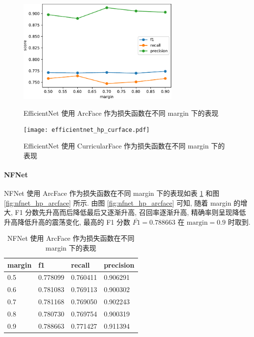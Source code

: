 \documentclass[12pt]{article}
\begin{document}
\begin{figure}[htbp]
  \centering
  \begin{minipage}[t]{0.48\textwidth}
    \centering
    \includegraphics[width=8cm]{efficientnet_hp_arcface.pdf}
    \caption{EfficientNet 使用 ArcFace 作为损失函数在不同 margin 下的表现}
    \label{fig:efficientnet_hp_arcface}
  \end{minipage}
  \begin{minipage}[t]{0.48\textwidth}
    \centering
    \texttt{[image: efficientnet\_hp\_curface.pdf]}
    \caption{EfficientNet 使用 CurricularFace 作为损失函数在不同 margin 下的表现}
    \label{fig:efficientnet_hp_curface}
  \end{minipage}
\end{figure}

\paragraph{NFNet}

NFNet 使用 ArcFace 作为损失函数在不同 margin 下的表现如表 \ref{tab:nfnet_hp_arcface} 和图 \ref{fig:nfnet_hp_arcface} 所示. 由图 \ref{fig:nfnet_hp_arcface} 可知, 随着 margin 的增大, F1 分数先升高而后降低最后又逐渐升高, 召回率逐渐升高, 精确率则呈现降低升高降低升高的震荡变化, 最高的 F1 分数 $\overline{F1}=0.788663$ 在 $\text{margin} = 0.9$ 时取到.

\begin{table}[htbp]
  \centering
  \caption{NFNet 使用 ArcFace 作为损失函数在不同 margin 下的表现}
  \label{tab:nfnet_hp_arcface}
  \begin{tabular}{llll}
    \toprule
    margin & f1       & recall   & precision \\
    \midrule
    0.5 & 0.778099 & 0.760411 & 0.906291  \\
    0.6 & 0.781083 & 0.769113 & 0.900302  \\
    0.7 & 0.781168 & 0.769050 & 0.902243  \\
    0.8 & 0.780730 & 0.769754 & 0.900319  \\
    0.9 & 0.788663 & 0.771427 & 0.911394  \\
    \bottomrule
  \end{tabular}
\end{table}
\end{document}
